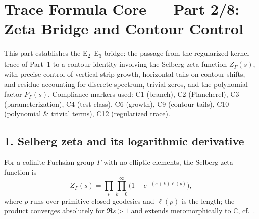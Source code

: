 
\section*{Trace Formula Core — Part 2/8: Zeta Bridge and Contour Control}\relax\hspace{0pt}
\label{sec:tfc-part2} %

\noindent
This part establishes the E\textsubscript{2}--E\textsubscript{3} bridge: the passage from the regularized kernel trace of Part~1 to a contour identity involving the Selberg zeta function $Z_\Gamma(s)$, with precise control of vertical-strip growth, horizontal tails on contour shifts, and residue accounting for discrete spectrum, trivial zeros, and the polynomial factor $P_\Gamma(s)$. Compliance markers used: C1 (branch), C2 (Plancherel), C3 (parameterization), C4 (test class), C6 (growth), C9 (contour tails), C10 (polynomial \& trivial terms), C12 (regularized trace).\relax\hspace{0pt}

\subsection*{1. Selberg zeta and its logarithmic derivative}\relax\hspace{0pt}
\label{subsec:tfc2-zeta} %

\begin{definition}\relax\hspace{0pt}
\label{def:tfc2-zeta} %
For a cofinite Fuchsian group $\Gamma$ with no elliptic elements, the Selberg zeta function is
\[
Z_\Gamma(s)=\prod_{p}\prod_{k=0}^{\infty}\big(1-e^{-(s+k)\ell(p)}\big),
\]
where $p$ runs over primitive closed geodesics and $\ell(p)$ is the length; the product converges absolutely for $\Re s>1$ and extends meromorphically to $\mathbb{C}$, cf.\ \cite{HejhalII,SelbergCollected}.\relax\hspace{0pt}
\end{definition}

